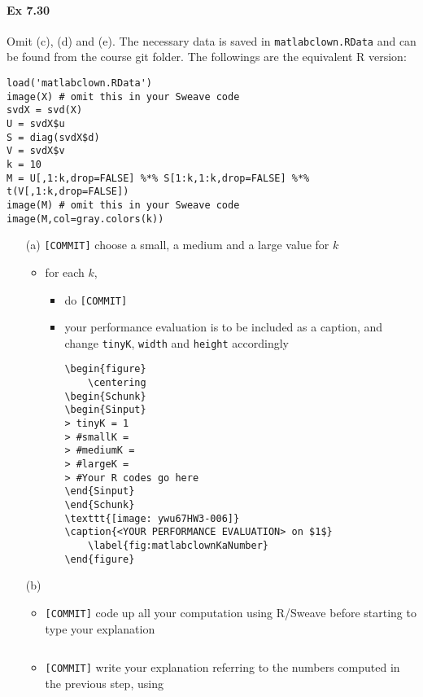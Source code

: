 \documentclass[12pt]{article}
\begin{document}
\paragraph{Ex 7.30}
Omit (c), (d) and (e). 
The necessary data is saved in \verb+matlabclown.RData+ 
and can be found from the course git folder.
The followings are the equivalent R version:
\begin{lstlisting}
load('matlabclown.RData')
image(X) # omit this in your Sweave code
svdX = svd(X)
U = svdX$u
S = diag(svdX$d)
V = svdX$v
k = 10
M = U[,1:k,drop=FALSE] %*% S[1:k,1:k,drop=FALSE] %*% t(V[,1:k,drop=FALSE])
image(M) # omit this in your Sweave code
image(M,col=gray.colors(k))
\end{lstlisting}
\begin{itemize}
    \item[(a)] \verb+[COMMIT]+ choose a small, a medium and a large value for $k$ 
         \begin{itemize}
             \item for each $k$, 
                 \begin{itemize}
             \item do \verb+[COMMIT]+ 
             \item your performance evaluation is to be included as a caption,
            and change \verb+tinyK+, \verb+width+ and \verb+height+ accordingly
\begin{lstlisting}
\begin{figure}
    \centering
\begin{Schunk}
\begin{Sinput}
> tinyK = 1
> #smallK = 
> #mediumK = 
> #largeK = 
> #Your R codes go here
\end{Sinput}
\end{Schunk}
\texttt{[image: ywu67HW3-006]}
\caption{<YOUR PERFORMANCE EVALUATION> on $1$}
    \label{fig:matlabclownKaNumber}
\end{figure}
\end{lstlisting}
                 \end{itemize}
         \end{itemize}
    \item[(b)] 
        \begin{itemize}
            \item \verb+[COMMIT]+ code up all your computation using R/Sweave
                before starting to type your explanation
\begin{lstlisting}
\end{lstlisting}
            \item \verb+[COMMIT]+ write your explanation referring to the
                numbers computed in the previous step, using
                \verb++
        \end{itemize}
\end{itemize}
\end{document}
